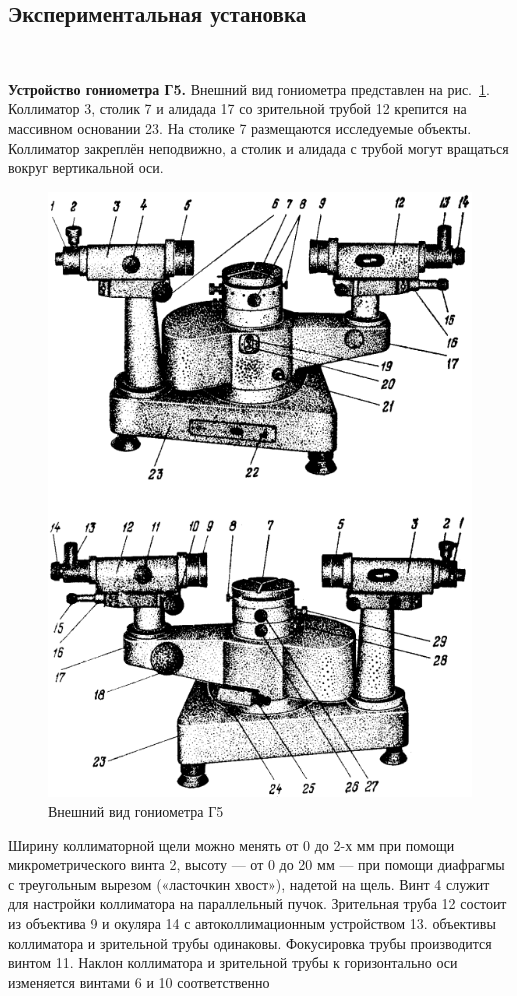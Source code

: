 \documentclass[12pt]{article}
\begin{document}
    \subsection*{Экспериментальная установка}
    \ \par
    \textbf{Устройство гониометра Г5.} Внешний вид гониометра представлен на рис.\ \ref{fig:fig2}.
    Коллиматор 3, столик 7 и алидада 17 со зрительной трубой 12 крепится на массивном основании 23.
    На столике 7 размещаются исследуемые объекты.
    Коллиматор закреплён неподвижно, а столик и алидада с трубой могут вращаться вокруг вертикальной оси.

    \begin{figure}[h]
        \centering
        \includegraphics[width=0.6\linewidth]{pic/setup}
        \caption{Внешний вид гониометра Г5}
        \label{fig:fig2}
    \end{figure}

    Ширину коллиматорной щели можно менять от 0 до 2-х мм при помощи
    микрометрического винта 2, высоту — от 0 до 20 мм — при помощи диафрагмы с треугольным вырезом («ласточкин хвост»), надетой на щель. Винт 4 служит для настройки коллиматора на параллельный пучок. Зрительная труба
    12 состоит из объектива 9 и окуляра 14 с автоколлимационным устройством
    13. объективы коллиматора и зрительной трубы одинаковы.
    Фокусировка трубы производится винтом 11.
    Наклон коллиматора и зрительной трубы к горизонтально оси изменяется винтами 6 и 10 соответственно
\end{document}
